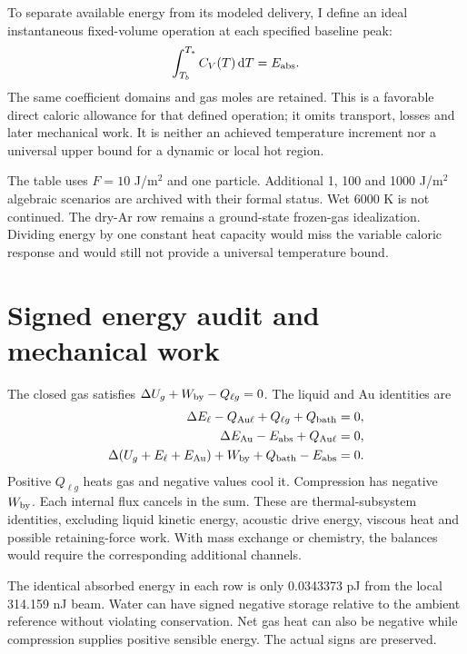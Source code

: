 \documentclass[10pt,a4paper]{article}
\newcommand{\dd}{\mathrm d}
\begin{document}
To separate available energy from its modeled delivery, I define an ideal instantaneous fixed-volume operation at each specified baseline peak:
\begin{equation}
\int_{T_b}^{T_*}C_V(T)\,\dd T=E_{\rm abs}.
\end{equation}
The same coefficient domains and gas moles are retained. This is a favorable direct caloric allowance for that defined operation; it omits transport, losses and later mechanical work. It is neither an achieved temperature increment nor a universal upper bound for a dynamic or local hot region.
\begin{center}\small\end{center}
The table uses $F=10$ J/m$^2$ and one particle. Additional 1, 100 and 1000 J/m$^2$ algebraic scenarios are archived with their formal status. Wet 6000 K is not continued. The dry-Ar row remains a ground-state frozen-gas idealization. Dividing energy by one constant heat capacity would miss the variable caloric response and would still not provide a universal temperature bound.
\clearpage
\section{Signed energy audit and mechanical work}
The closed gas satisfies $\Delta U_g+W_{\rm by}-Q_{\ell g}=0$. The liquid and Au identities are
\begin{align}
\Delta E_\ell-Q_{{\rm Au}\ell}+Q_{\ell g}+Q_{\rm bath}&=0,\\
\Delta E_{\rm Au}-E_{\rm abs}+Q_{{\rm Au}\ell}&=0,\\
\Delta(U_g+E_\ell+E_{\rm Au})+W_{\rm by}+Q_{\rm bath}-E_{\rm abs}&=0.
\end{align}
Positive $Q_{\ell g}$ heats gas and negative values cool it. Compression has negative $W_{\rm by}$. Each internal flux cancels in the sum. These are thermal-subsystem identities, excluding liquid kinetic energy, acoustic drive energy, viscous heat and possible retaining-force work. With mass exchange or chemistry, the balances would require the corresponding additional channels.
\begin{table}[H]\centering\small
\caption{Saved endpoint energies, reassembled in MR8, in pJ. The first two endpoints are five-cycle endpoints; 1.30* stops at its observed coefficient boundary. Acoustic background is included, so these are not laser-tagged storage amounts.}

\end{table}
The identical absorbed energy in each row is only 0.0343373 pJ from the local 314.159 nJ beam. Water can have signed negative storage relative to the ambient reference without violating conservation. Net gas heat can also be negative while compression supplies positive sensible energy. The actual signs are preserved.
\end{document}
